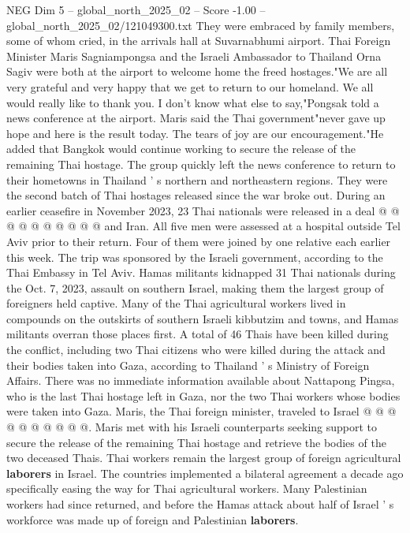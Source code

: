 \begin{textsample}{NEG Dim 5 – global\_north\_2025\_02 – Score -1.00 – global\_north\_2025\_02/121049300.txt}  \label{ex:f5_neg_122}
They were embraced by family members, some of whom cried, in the arrivals hall at Suvarnabhumi airport.
Thai Foreign Minister Maris Sagniampongsa and the Israeli Ambassador to Thailand Orna Sagiv were both at the airport to welcome home the freed hostages."We are all very grateful and very happy that we get to return to our homeland.
We all would really like to thank you.
I don't know what else to say,"Pongsak told a news conference at the airport.
Maris said the Thai government"never gave up hope and here is the result today.
The tears of joy are our encouragement."He added that Bangkok would continue working to secure the release of the remaining Thai hostage.
The group quickly left the news conference to return to their hometowns in Thailand ' s northern and northeastern regions.
They were the second batch of Thai hostages released since the war broke out.
During an earlier ceasefire in November 2023, 23 Thai nationals were released in a deal @ @ @ @ @ @ @ @ @ @ and Iran.
All five men were assessed at a hospital outside Tel Aviv prior to their return.
Four of them were joined by one relative each earlier this week.
The trip was sponsored by the Israeli government, according to the Thai Embassy in Tel Aviv.
Hamas militants kidnapped 31 Thai nationals during the Oct. 7, 2023, assault on southern Israel, making them the largest group of foreigners held captive.
Many of the Thai agricultural workers lived in compounds on the outskirts of southern Israeli kibbutzim and towns, and Hamas militants overran those places first.
A total of 46 Thais have been killed during the conflict, including two Thai citizens who were killed during the attack and their bodies taken into Gaza, according to Thailand ' s Ministry of Foreign Affairs.
There was no immediate information available about Nattapong Pingsa, who is the last Thai hostage left in Gaza, nor the two Thai workers whose bodies were taken into Gaza.
Maris, the Thai foreign minister, traveled to Israel @ @ @ @ @ @ @ @ @ @.
Maris met with his Israeli counterparts seeking support to secure the release of the remaining Thai hostage and retrieve the bodies of the two deceased Thais.
Thai workers remain the largest group of foreign agricultural \textbf{laborers} in Israel.
The countries implemented a bilateral agreement a decade ago specifically easing the way for Thai agricultural workers.
Many Palestinian workers had since returned, and before the Hamas attack about half of Israel ' s workforce was made up of foreign and Palestinian \textbf{laborers}.

\end{textsample}
